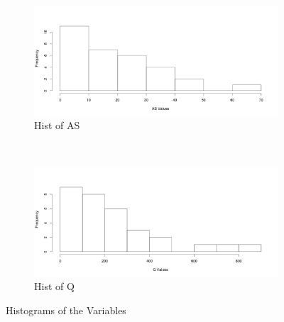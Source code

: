 \documentclass[a4paper,12pt, english]{article}
\begin{document}
\begin{figure}[!htbp]
        ~ %
        \begin{subfigure}[b]{0.45\textwidth}
                \includegraphics[width=\textwidth]{as-hist}
                \caption{Hist of AS}
                \label{fig:as-hist}
        \end{subfigure}
        ~ %
        \begin{subfigure}[b]{0.45\textwidth}
                \includegraphics[width=\textwidth]{q-hist}
                \caption{Hist of Q}
                \label{fig:q-hist}
        \end{subfigure}
        \caption{Histograms of the Variables}
        \label{fig:histograms}
\end{figure}
\end{document}
